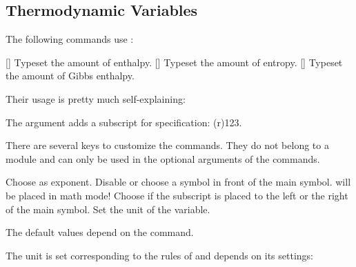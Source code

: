 \documentclass[load-preamble+]{cnltx-doc}
\begin{document}
\subsection{Thermodynamic Variables}\label{sec:therm-vari}

The following commands use :
\begin{commands}
  []
    Typeset the amount of enthalpy.
  []
    Typeset the amount of entropy.
  []
    Typeset the amount of Gibbs enthalpy.
\end{commands}

Their usage is pretty much self-explaining:
\begin{example}
   \par
   \par
\end{example}
The argument  adds a subscript for specification:
 \Enthalpy(r){123}.

There are several keys to customize the commands.  They do not belong to a
module and can only be used in the optional arguments of the commands.
\begin{options}
    Choose  as exponent.
    Disable or choose a symbol in front of the main symbol.  
    will be placed in math mode!
    Choose if the subscript is placed to the left or the right of the main
    symbol.
    Set the unit of the variable.
\end{options}

The default values depend on the command.
\begin{example}
   \par
   \par
\end{example}
The unit is set corresponding to the rules of  and depends on
its settings:
\begin{example}
   \par
\end{example}
\end{document}
